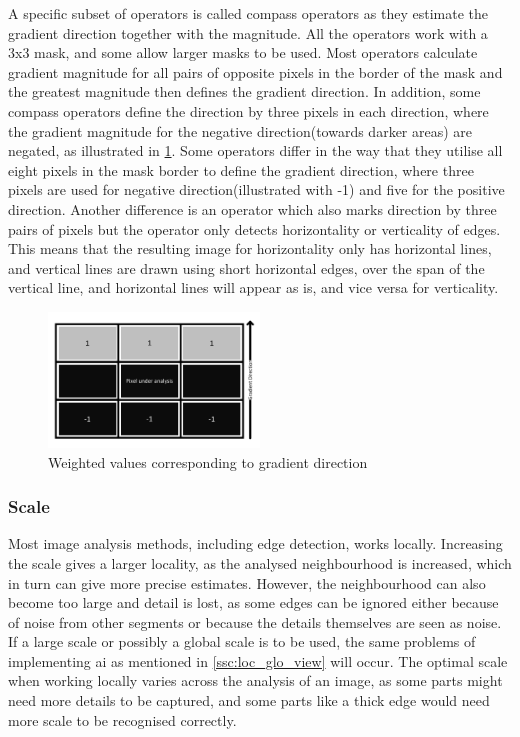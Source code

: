 A specific subset of operators is called compass operators as they estimate the gradient direction together with the magnitude. All the operators work with a 3x3 mask, and some allow larger masks to be used. Most operators calculate gradient magnitude for all pairs of opposite pixels in the border of the mask and the greatest magnitude then defines the gradient direction.
In addition, some compass operators define the direction by three pixels in each direction, where the gradient magnitude for the negative direction(towards darker areas) are negated, as illustrated in \cref{fig:mask_dir}.
Some operators differ in the way that they utilise all eight pixels in the mask border to define the gradient direction, where three pixels are used for negative direction(illustrated with -1) and five for the positive direction. Another difference is an operator which also marks direction by three pairs of pixels but the operator only detects horizontality or verticality of edges. This means that the resulting image for horizontality only has horizontal lines, and vertical lines are drawn using short horizontal edges, over the span of the vertical line, and horizontal lines will appear as is, and vice versa for verticality.
\begin{figure}[H]
	\centering
	\includegraphics[width=0.5\textwidth]{graphics/mask_directed.pdf}
	\caption{Weighted values corresponding to gradient direction}
	\label{fig:mask_dir}
\end{figure}

\subsubsection{Scale}
Most image analysis methods, including edge detection, works locally. Increasing the scale gives a larger locality, as the analysed neighbourhood is increased, which in turn can give more precise estimates. However, the neighbourhood can also become too large and detail is lost, as some edges can be ignored either because of noise from other segments or because the details themselves are seen as noise.
If a large scale or possibly a global scale is to be used, the same problems of implementing \gls{ai} as mentioned in \cref{ssc:loc_glo_view} will occur. The optimal scale when working locally varies across the analysis of an image, as some parts might need more details to be captured, and some parts like a thick edge would need more scale to be recognised correctly.

